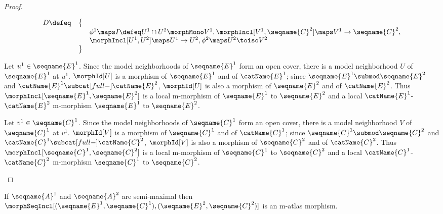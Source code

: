 \documentclass{article}
\begin{document}
\begin{lemma}
\begin{proof}
\begin{description}
\begin{equation*}
\begin{array} {lll}
D \defeq & \bigl \{
\\
  &&
  \phi^1 \maps I \defeq U^1 \cap U^2 \morphMono V^1,
  \morphIncl[{V^1},{\seqname{C}^2}] \maps  V^1 \to \seqname{C}^2,
\\
  &&
  \morphIncl[{U^1},{U^2}] \maps  U^1 \to U^2,
  \phi^2 \maps U^2 \toiso V^2
\\
& \bigr \}
\end{array}
\end{equation*}

\item%
  [
    \ensuremath
      {
        \morphSeqIncl%
          [
            {(\seqname{E}^1, \seqname{C}^1)},
            {(\seqname{E}^2, \seqname{C}^2)}
          ]
      }
    is semi-strict:
  ]

Let $u^1 \in \seqname{E}^1$. Since the model neighborhoods of
$\seqname{E}^1$ form an open cover, there is a model neighborhood $U$ of
$\seqname{E}^1$ at $u^1$. $\morphId[{U}]$ is a morphism of $\seqname{E}^1$
and of $\catName{E}^1$; since $\seqname{E}^1 \submod \seqname{E}^2$ and
$\catName{E}^1 \subcat[full-] \catName{E}^2$, $\morphId[{U}]$ is also a
morphism of $\seqname{E}^2$ and of $\catName{E}^2$. Thus
$
\morphIncl%
  [
    {\seqname{E}^1},
    {\seqname{E}^2}
  ]
$
is a local m-morphism of $\seqname{E}^1$ to $\seqname{E}^2$ and a local
$\catName{E}^1$-$\catName{E}^2$ m-morphism $\seqname{E}^1$ to $\seqname{E}^2$.

Let $v^1 \in \seqname{C}^1$. Since the model neighborhoods of
$\seqname{C}^1$ form an open cover, there is a model neighborhood $V$ of
$\seqname{C}^1$ at $v^1$. $\morphId[{V}]$ is a morphism of $\seqname{C}^1$
and of $\catName{C}^1$; since $\seqname{C}^1 \submod \seqname{C}^2$ and
$\catName{C}^1 \subcat[full-] \catName{C}^2$, $\morphId[{V}]$ is also a
morphism of $\seqname{C}^2$ and of $\catName{C}^2$. Thus
$
  \morphIncl%
    [
      {\seqname{C}^1},
      {\seqname{C}^2}
    ]
$
is a local m-morphism of $\seqname{C}^1$ to $\seqname{C}^2$ and a local
$\catName{C}^1$-$\catName{C}^2$ m-morphism $\seqname{C}^1$ to $\seqname{C}^2$.
\end{description}
\end{proof}

If $\seqname{A}^1$ and $\seqname{A}^2$ are semi-maximal then
$
  \morphSeqIncl%
    [
      {(\seqname{E}^1, \seqname{C}^1)},
      {(\seqname{E}^2, \seqname{C}^2)}
    ]
$
is an m-atlas morphism.


\end{lemma}
\end{document}

